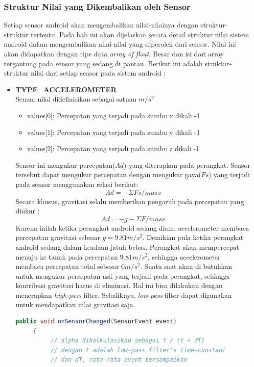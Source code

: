\subsubsection{Struktur Nilai yang Dikembalikan oleh Sensor}
\label{sssec:struktur_nilai_yang_dikembalikan_oleh_sensor}
Setiap sensor android akan mengembalikan nilai-nilainya dengan struktur-struktur tertentu. Pada bab ini akan dijelaskan secara detail struktur nilai sistem android dalam mengembalikan nilai-nilai yang diperoleh dari sensor. Nilai ini akan didapatkan dengan tipe data \textit{array of float}. Besar dan isi dari array tergantung pada sensor yang sedang di pantau. Berikut ini adalah struktur-struktur nilai dari setiap sensor pada sistem android :\\
\begin{itemize}
	\item \textbf{TYPE\_ACCELEROMETER}\\
Semua nilai didefinisikan sebagai satuan \(m/s^2\)
\begin{itemize}
	\item values[0]: Percepatan yang terjadi pada sumbu x dikali -1
	\item values[1]: Percepatan yang terjadi pada sumbu y dikali -1
	\item values[2]: Percepatan yang terjadi pada sumbu z dikali -1
\end{itemize}
Sensor ini mengukur percepatan(\(Ad\)) yang diterapkan pada perangkat. Sensor tersebut dapat mengukur percepatan dengan mengukur gaya(\(Fs\)) yang terjadi pada sensor menggunakan relasi berikut:
\[
	Ad = -\Sigma Fs / mass
\]
Secara khusus, gravitasi selalu memberikan pengaruh pada percepatan yang diukur :
\[
	Ad =  -g -\Sigma F / mass
\]
Karena inilah ketika perangkat android sedang diam, accelerometer membaca percepatan gravitasi sebesar \(g = 9.81m/s^2\).
Demikian pula ketika perangkat android sedang dalam keadaan jatuh bebas. Perangkat akan mempercepat menuju ke tanah pada percepatan \(9.81 m/s^2\), sehingga accelerometer membaca percepatan total sebesar \( 0 m/s^2\). 
Suatu saat akan di butuhkan untuk mengukur percepatan asli yang terjadi pada perangkat, sehingga kontribusi gravitasi harus di eliminasi. Hal ini bisa dilakukan dengan menerapkan \textit{high-pass} filter. Sebaliknya, \textit{low-pass} filter dapat digunakan untuk mendapatkan nilai gravitasi saja. 
\begin{lstlisting}[caption={Implementasi \textit{low-pass} filter},label={lst:low-pass-filter},language=java]
	 public void onSensorChanged(SensorEvent event)
     {
          // alpha dikalkulasikan sebagai t / (t + dT)
          // dengan t adalah low-pass filter's time-constant
          // dan dT, rata-rata event tersampaikan


\end{lstlisting}
\end{itemize}
